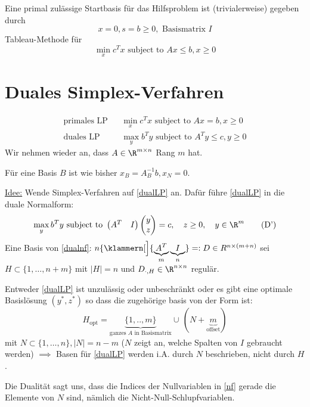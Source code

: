 Eine primal zulässige Startbasis für das Hilfsproblem ist (trivialerweise) gegeben durch
\begin{equation*}
	x = 0, s = b \geq 0, \text{ Basismatrix } I
\end{equation*}
Tableau-Methode für %
\begin{equation*}
	\min_{x}c^Tx \text{ subject to } Ax \leq b , x \geq 0
\end{equation*}
\section{Duales Simplex-Verfahren}
\begin{align}
  \text{primales LP} && \min_{x}c^{T} x \text{ subject to }Ax = b, x \geq 0 \tag{P} \label{primalLP} \\
  \text{duales LP} && \max_{y}b^{T} y \text{ subject to }A^{T} y \leq c, y \geq 0 \tag{D}\label{dualLP}
\end{align}
Wir nehmen wieder an, dass $A \in \R^{m \times n}$ Rang $m$ hat.

Für eine Basis $B$ ist wie bisher $x_{B}= A^{-1}_{B}b, x_{N}=0$.

\underline{Idee:} Wende Simplex-Verfahren auf \eqref{dualLP} an.
Dafür führe \eqref{dualLP} in die duale Normalform:
\begin{equation}\label{dualnf}
	\max_{y} b^{T} y \text{ subject to }
	\begin{pmatrix}
		A^{T} & I
	\end{pmatrix}
	\begin{pmatrix}
	y\\z
	\end{pmatrix}
	= c, \quad z \geq 0, \quad y \in \R^m \tag{D'}
\end{equation}
Eine Basis von \eqref{dualnf}: $n \{ \klammern[\Big]{ \underbrace{A^T}_m \underbrace I_n} =: D
\in R^{n \times(m +n)}$
sei $H \subset \{1,\dots ,n+m \}$ mit $|H|=n$ und $D_{\cdot,H}\in \R^{n \times n}$ regulär.
\begin{theorem}
	Entweder \eqref{dualLP} ist unzulässig oder unbeschränkt oder es gibt eine optimale Basislösung $(y^*,z^*)$ so dass die zugehörige basis von der Form ist:
	\begin{equation*}
    H_{\text{opt}}=\underbrace{ \{1,..,m \}}_{\text{ganzes $A$ in Basismatrix}}\cup \, (N+\underbrace{m}_{\text{offset}})
	\end{equation*}
	mit $N \subset \{1,\dots ,n \}, |N|= n-m$ ($N$ zeigt an, welche Spalten von $I$ gebraucht werden)
	$\implies$ Basen für \eqref{dualLP} werden i.A. durch $N$ beschrieben, nicht durch $H$.
\end{theorem}
Die Dualität sagt uns, dass die Indices der Nullvariablen in \eqref{nf} gerade die Elemente von $N$ sind, nämlich die Nicht-Null-Schlupfvariablen.


